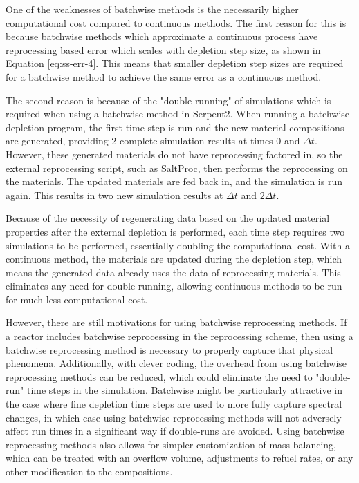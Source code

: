One of the weaknesses of batchwise methods is the necessarily higher computational cost compared to continuous methods. The first reason for this is because batchwise methods which approximate a continuous process have reprocessing based error which scales with depletion step size, as shown in Equation \eqref{eq:ss-err-4}. This means that smaller depletion step sizes are required for a batchwise method to achieve the same error as a continuous method. 

The second reason is because of the "double-running" of simulations which is required when using a batchwise method in Serpent2. When running a batchwise depletion program, the first time step is run and the new material compositions are generated, providing 2 complete simulation results at times 0 and $\Delta t$. However, these generated materials do not have reprocessing factored in, so the external reprocessing script, such as SaltProc, then performs the reprocessing on the materials. The updated materials are fed back in, and the simulation is run again. This results in two new simulation results at $\Delta t$ and $2 \Delta t$. 

Because of the necessity of regenerating data based on the updated material properties after the external depletion is performed, each time step requires two simulations to be performed, essentially doubling the computational cost. With a continuous method, the materials are updated during the depletion step, which means the generated data already uses the data of reprocessing materials. This eliminates any need for double running, allowing continuous methods to be run for much less computational cost.

However, there are still motivations for using batchwise reprocessing methods. If a reactor includes batchwise reprocessing in the reprocessing scheme, then using a batchwise reprocessing method is necessary to properly capture that physical phenomena. Additionally, with clever coding, the overhead from using batchwise reprocessing methods can be reduced, which could eliminate the need to "double-run" time steps in the simulation. Batchwise might be particularly attractive in the case where fine depletion time steps are used to more fully capture spectral changes, in which case using batchwise reprocessing methods will not adversely affect run times in a significant way if double-runs are avoided. Using batchwise reprocessing methods also allows for simpler customization of mass balancing, which can be treated with an overflow volume, adjustments to refuel rates, or any other modification to the compositions. 

